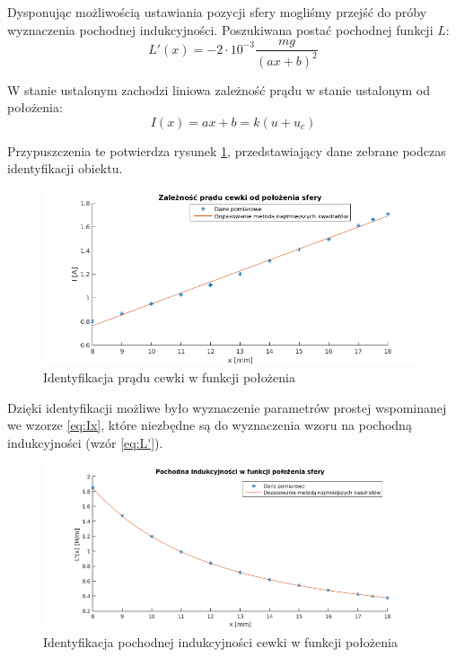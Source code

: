 Dysponując możliwością ustawiania pozycji sfery mogliśmy przejść do próby wyznaczenia pochodnej indukcyjności. Poszukiwana postać pochodnej funkcji $L$:
\begin{equation} \label{eq:L'}
L'(x) = - 2 \cdot 10^{-3}\dfrac{mg}{(ax + b)^2}
\end{equation}

W stanie ustalonym zachodzi liniowa zależność prądu w stanie ustalonym od położenia:
\begin{equation} \label{eq:Ix}
I(x) = ax + b = k(u + u_c)
\end{equation}

Przypuszczenia te potwierdza rysunek \ref{rys:prad_od_polozenia}, przedstawiający dane zebrane podczas identyfikacji obiektu.

\begin{figure}[H]
\centering
\includegraphics[scale=0.75]{img/identyfikacja_prad_cewki_od_polozenia.png}
\caption{Identyfikacja prądu cewki w funkcji położenia}
\label{rys:prad_od_polozenia}
\end{figure}

Dzięki identyfikacji możliwe było wyznaczenie parametrów prostej wspominanej we wzorze \ref{eq:Ix}, które niezbędne są do wyznaczenia wzoru na pochodną indukcyjności (wzór \ref{eq:L'}).

\begin{figure}[H]
\centering
\includegraphics[scale=0.75]{img/identyfikacja_pochodna_indykcyjnosci_od_polozenia.png}
\caption{Identyfikacja pochodnej indukcyjności cewki w funkcji położenia}
\label{rys:pochodna_od_polozenia}
\end{figure}

